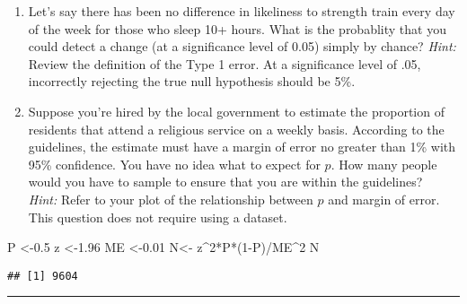 \documentclass[
]{article}
\newenvironment{Shaded}{\begin{snugshade}}{\end{snugshade}}
\newcommand{\DecValTok}[1]{\textcolor[rgb]{0.00,0.00,0.81}{#1}}
\newcommand{\FloatTok}[1]{\textcolor[rgb]{0.00,0.00,0.81}{#1}}
\newcommand{\NormalTok}[1]{#1}
\newcommand{\OtherTok}[1]{\textcolor[rgb]{0.56,0.35,0.01}{#1}}
\newcommand{\SpecialCharTok}[1]{\textcolor[rgb]{0.00,0.00,0.00}{#1}}
\providecommand{\tightlist}{%
  \setlength{\itemsep}{0pt}\setlength{\parskip}{0pt}}
\begin{document}
\begin{enumerate}
\def\labelenumi{\arabic{enumi}.}
\setcounter{enumi}{9}
\tightlist
\item
  Let's say there has been no difference in likeliness to strength train
  every day of the week for those who sleep 10+ hours. What is the
  probablity that you could detect a change (at a significance level of
  0.05) simply by chance? \emph{Hint:} Review the definition of the Type
  1 error. \textbar{} At a significance level of .05, incorrectly
  rejecting the true null hypothesis should be 5\%.
\item
  Suppose you're hired by the local government to estimate the
  proportion of residents that attend a religious service on a weekly
  basis. According to the guidelines, the estimate must have a margin of
  error no greater than 1\% with 95\% confidence. You have no idea what
  to expect for \(p\). How many people would you have to sample to
  ensure that you are within the guidelines?\\
  \emph{Hint:} Refer to your plot of the relationship between \(p\) and
  margin of error. This question does not require using a dataset.
\end{enumerate}

\begin{Shaded}
\begin{Highlighting}[]
\NormalTok{P }\OtherTok{\textless{}{-}}\FloatTok{0.5}
\NormalTok{z }\OtherTok{\textless{}{-}}\FloatTok{1.96}
\NormalTok{ME }\OtherTok{\textless{}{-}}\FloatTok{0.01}
\NormalTok{N}\OtherTok{\textless{}{-}}\NormalTok{ z}\SpecialCharTok{\^{}}\DecValTok{2}\SpecialCharTok{*}\NormalTok{P}\SpecialCharTok{*}\NormalTok{(}\DecValTok{1}\SpecialCharTok{{-}}\NormalTok{P)}\SpecialCharTok{/}\NormalTok{ME}\SpecialCharTok{\^{}}\DecValTok{2}
\NormalTok{N}
\end{Highlighting}
\end{Shaded}

\begin{verbatim}
## [1] 9604
\end{verbatim}

\begin{center}\rule{0.5\linewidth}{0.5pt}\end{center}
\end{document}
